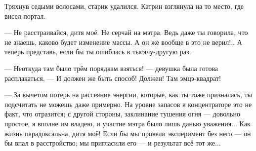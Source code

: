 Тряхнув седыми волосами, старик удалился. Катрин взглянула на то место, где висел портал.

--- Не расстраивайся, дитя моё. Не серчай на мэтра. Ведь даже ты говорила, что не знаешь, каково будет изменение массы.
А он же вообще в это не верил!.. А теперь представь, если бы ты ошиблась в тысячу-другую раз.

--- Неоткуда там было трём порядкам взяться! --- девушка была готова расплакаться,
--- И должен же быть способ! Должен! Там эмцэ-квадрат!

--- За вычетом потерь на рассеяние энергии, которые, как ты тоже призналась, ты подсчитать не можешь даже примерно.
На уровне запасов в концентраторе это не факт, что отразится; с другой стороны, заклинание тушения огня
--- довольно простое, я вполне им владею, и участие мэтра было лишь данью уважения... Как жизнь парадоксальна, дитя моё!
Если бы мы провели эксперимент без него --- он бы впал в расстройство; мы пригласили его --- и результат всё тот же...

\emptypar

\emptypar
